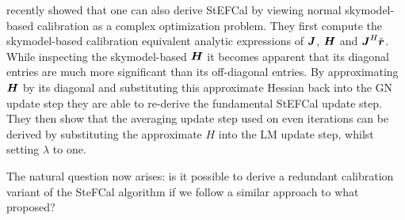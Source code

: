 \documentclass[useAMS,usenatbib]{mn2e}
\newcommand{\br}{\bmath{r}}
\newcommand{\bJ}{\bmath{J}}
\newcommand{\bH}{\bmath{H}}
\begin{document}
\citet{Smirnov2015} recently showed that one can also derive StEFCal by viewing normal skymodel-based calibration as a complex optimization problem. They first compute the skymodel-based calibration equivalent analytic expressions of $\bJ$,
$\bH$ and $\bJ^H\breve{\br}$. While inspecting the skymodel-based $\bH$ it becomes apparent that its diagonal entries are much more significant than its off-diagonal entries.
By approximating $\bH$ by its diagonal and substituting this approximate Hessian back into the GN update step they are able to re-derive the fundamental StEFCal update step. They then show that the 
averaging update step used on even iterations can be derived by substituting the approximate $H$ into the LM update step, whilst setting $\lambda$ to one.

The natural question now arises: is it possible to derive a redundant calibration variant of the SteFCal algorithm if we follow a similar approach to what \citet{Smirnov2015}
proposed?
\end{document}
